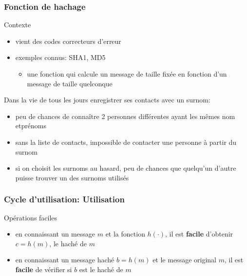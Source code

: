 \begin{reveals}
\begin{frame}
  \frametitle{Fonction de hachage}

  \vfill
  
  \begin{block}{Contexte}
    \begin{itemize}
    \item vient des codes correcteurs d'erreur
    \item exemples connus: SHA1, MD5 
      \begin{itemize}
      \item une fonction qui calcule un message de taille fixée en
        fonction d'un message de taille quelconque
      \end{itemize}
    \end{itemize}
  \end{block}
  
  \vfill

  \begin{block}{Dans la vie de tous les jours}
    enregistrer ses contacts avec un surnom:
    \begin{itemize}
    \item peu de chances de connaître 2 personnes différentes ayant
      les mêmes nom etprénoms
    \item sans la liste de contacts, impossible de contacter une
      personne à partir du surnom
    \item si on choisit les surnoms au hasard, peu de chances que
      quelqu'un d'autre puisse trouver un des surnoms utilisés
    \end{itemize}
  \end{block}

  \vfill


\end{frame}




\begin{frame}
  \frametitle{Cycle d'utilisation: Utilisation}

  \vfill

  \begin{block}{Opérations faciles}
    \begin{itemize}
    \item en connaissant un message \(m\) et la fonction \(h(\cdot)\),
      il est \textbf{facile} d'obtenir \(c=h(m)\), le haché de \(m\)
    \item en connaissant un message haché \(b=h(m)\) et le message
      original \(m\), il est \textbf{facile} de vérifier si \(b\) est
      le haché de \(m\)
    \end{itemize}
  \end{block}


\end{frame}
\end{reveals}
